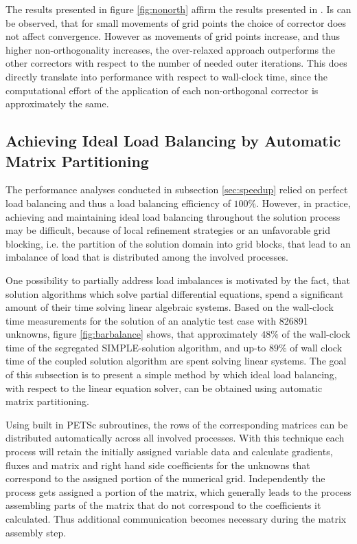 The results presented in figure \ref{fig:nonorth} affirm the results presented in \cite{jasak96}. Is can be observed, that for small movements of grid points the choice of corrector does not affect convergence. However as movements of grid points increase, and thus higher non-orthogonality increases, the over-relaxed approach outperforms the other correctors with respect to the number of needed outer iterations. This does directly translate into performance with respect to wall-clock time, since the computational effort of the application of each non-orthogonal corrector is approximately the same.

\subsection{Achieving Ideal Load Balancing by Automatic Matrix Partitioning}

The performance analyses conducted in subsection \ref{sec:speedup} relied on perfect load balancing and thus a load balancing efficiency of \(100\%\). However, in practice, achieving and maintaining ideal load balancing throughout the solution process may be difficult, because of local refinement strategies or an unfavorable grid blocking, i.e. the partition of the solution domain into grid blocks, that lead to an imbalance of load that is distributed among the involved processes. 

One possibility to partially address load imbalances is motivated by the fact, that solution algorithms which solve partial differential equations, spend a significant amount of their time solving linear algebraic systems. Based on the wall-clock time measurements for the solution of an analytic test case with 826891 unknowns, figure \ref{fig:barbalance} shows, that approximately \(48\%\) of the wall-clock time of the segregated SIMPLE-solution algorithm, and up-to \(89\%\) of wall clock time of the coupled solution algorithm are spent solving linear systems. The goal of this subsection is to present a simple method by which ideal load balancing, with respect to the linear equation solver, can be obtained using automatic matrix partitioning.

Using built in PETSc subroutines, the rows of the corresponding matrices can be distributed automatically across all involved processes. With this technique each process will retain the initially assigned variable data and calculate gradients, fluxes and matrix and right hand side coefficients for the unknowns that correspond to the assigned portion of the numerical grid. Independently the process gets assigned a portion of the matrix, which generally leads to the process assembling parts of the matrix that do not correspond to the coefficients it calculated. Thus additional communication becomes necessary during the matrix assembly step.

